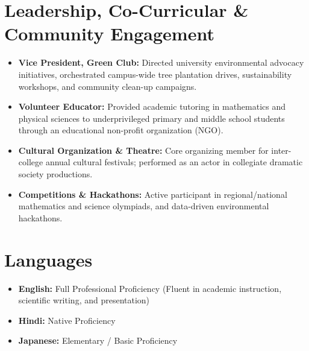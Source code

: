 \documentclass[10pt,a4paper]{article}
\begin{document}
\section{Leadership, Co-Curricular \& Community Engagement}
\begin{itemize}
    \item \textbf{Vice President, Green Club:} Directed university environmental advocacy initiatives, orchestrated campus-wide tree plantation drives, sustainability workshops, and community clean-up campaigns.
    \item \textbf{Volunteer Educator:} Provided academic tutoring in mathematics and physical sciences to underprivileged primary and middle school students through an educational non-profit organization (NGO).
    \item \textbf{Cultural Organization \& Theatre:} Core organizing member for inter-college annual cultural festivals; performed as an actor in collegiate dramatic society productions.
    \item \textbf{Competitions \& Hackathons:} Active participant in regional/national mathematics and science olympiads, and data-driven environmental hackathons.
\end{itemize}

\section{Languages}
\begin{itemize}
    \item \textbf{English:} Full Professional Proficiency (Fluent in academic instruction, scientific writing, and presentation)
    \item \textbf{Hindi:} Native Proficiency
    \item \textbf{Japanese:} Elementary / Basic Proficiency
\end{itemize}
\end{document}
